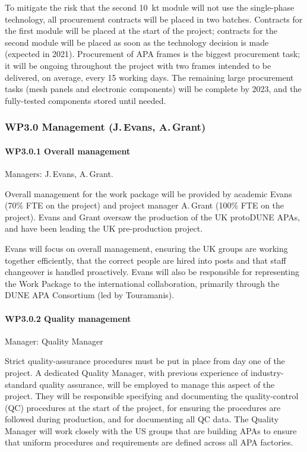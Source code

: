 To mitigate the risk that the second \SI{10}{\kilo\tonne} module will not use the single-phase technology, all procurement contracts will be placed in two batches. Contracts for the first module will be placed at the start of the project; contracts for the second module will be placed as soon as the technology decision is made (expected in 2021). Procurement of APA frames is the biggest procurement task; it will be ongoing throughout the project with two frames intended to be delivered, on average, every 15 working days.  The remaining large procurement tasks (mesh panels and electronic components) will be complete by 2023, and the fully-tested components stored until needed.

\subsubsection{WP3.0 Management (J.\,Evans, A.\,Grant)}


\paragraph{WP3.0.1 Overall management} Managers: J.\,Evans, A.\,Grant.

Overall management for the work package will be provided by academic Evans (70\% FTE on the project) and project manager A.\,Grant (100\% FTE on the project). Evans and Grant oversaw the production of the UK protoDUNE APAs, and have been leading the UK pre-production project. 

Evans will focus on overall management, ensuring the UK groups are working together efficiently, that the correct people are hired into posts and that staff changeover is handled proactively. Evans will also be responsible for representing the Work Package to the international collaboration, primarily through the DUNE APA Consortium (led by Touramanis).

\paragraph{WP3.0.2 Quality management} Manager: Quality Manager

Strict quality-assurance procedures must be put in place from day one of the project. A dedicated Quality Manager, with previous experience of industry-standard quality assurance, will be employed to manage this aspect of the project. They will be responsible specifying and documenting the quality-control (QC) procedures at the start of the project, for ensuring the procedures are followed during production, and for documenting all QC data. The Quality Manager will work closely with the US groups that are building APAs to ensure that uniform procedures and requirements are defined across all APA factories.

